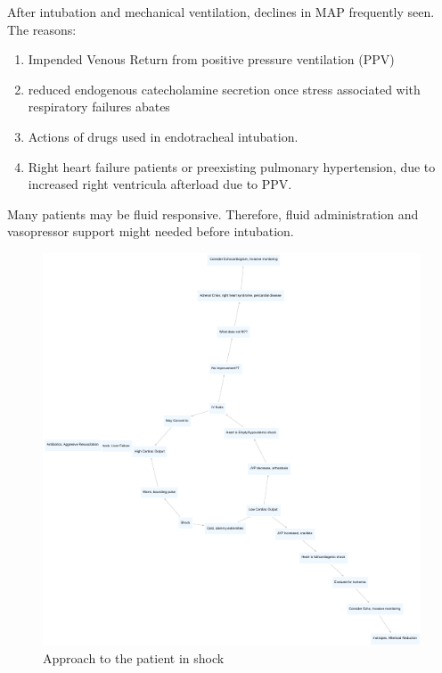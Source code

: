 \documentclass[
  letterpaper,
  DIV=11,
  numbers=noendperiod]{scrreprt}
\providecommand{\tightlist}{%
  \setlength{\itemsep}{0pt}\setlength{\parskip}{0pt}}\usepackage{longtable,booktabs,array}
\begin{document}
After intubation and mechanical ventilation, declines in MAP frequently
seen. The reasons:

\begin{enumerate}
\def\labelenumi{\arabic{enumi}.}
\tightlist
\item
  Impended Venous Return from positive pressure ventilation (PPV)
\item
  reduced endogenous catecholamine secretion once stress associated with
  respiratory failures abates
\item
  Actions of drugs used in endotracheal intubation.
\item
  Right heart failure patients or preexisting pulmonary hypertension,
  due to increased right ventricula afterload due to PPV.
\end{enumerate}

Many patients may be fluid responsive. Therefore, fluid administration
and vasopressor support might needed before intubation.

\begin{figure}[H]

{\centering \includegraphics{critical_care_files/figure-pdf/unnamed-chunk-3-1.pdf}

}

\caption{Approach to the patient in shock}

\end{figure}%
\end{document}
